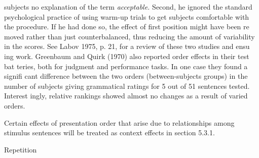 \clearpage\setcounter{page}{1}\begin{styleStandard}
subjects no explanation of the term \textit{acceptable.}\textit{ }Second, he ignored the standard psychological practice of using warm-up trials to get subjects comfortable with the procedure. If he had done so, the effect of first position might have been re\- moved rather than just counterbalanced, thus reducing the amount of variability in the scores. See Labov 1975, p. 21, for a review of these two studies and ensu\- ing work. Greenbaum and Quirk (1970) also reported order effects in their test bat\- teries, both for judgment and performance tasks. In one case they found a signifi\- cant difference between the two orders (between-subjects groups) in the number of subjects giving {\textquotedbl}grammatical{\textquotedbl} ratings for 5 out of 51 sentences tested. Interest\- ingly, relative rankings showed almost no changes as a result of varied orders.
\end{styleStandard}


\begin{styleStandard}
Certain effects of presentation order that arise due to relationships among stimulus sentences will be treated as context effects in section 5.3.1.
\end{styleStandard}


\begin{styleHeadingviii}
Repetition
\end{styleHeadingviii}


